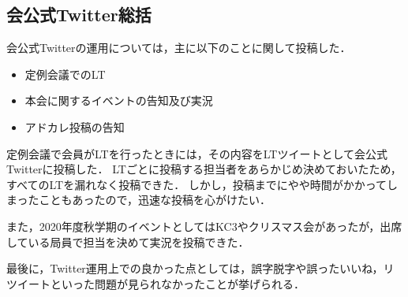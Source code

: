 \subsection*{会公式Twitter総括}



会公式Twitterの運用については，主に以下のことに関して投稿した．

\begin{itemize}
\item 定例会議でのLT
\item 本会に関するイベントの告知及び実況
\item アドカレ投稿の告知
\end{itemize}


定例会議で会員がLTを行ったときには，その内容をLTツイートとして会公式Twitterに投稿した．
LTごとに投稿する担当者をあらかじめ決めておいたため，すべてのLTを漏れなく投稿できた．
しかし，投稿までにやや時間がかかってしまったこともあったので，迅速な投稿を心がけたい．

また，2020年度秋学期のイベントとしてはKC3やクリスマス会があったが，出席している局員で担当を決めて実況を投稿できた．

最後に，Twitter運用上での良かった点としては，誤字脱字や誤ったいいね，リツイートといった問題が見られなかったことが挙げられる．
